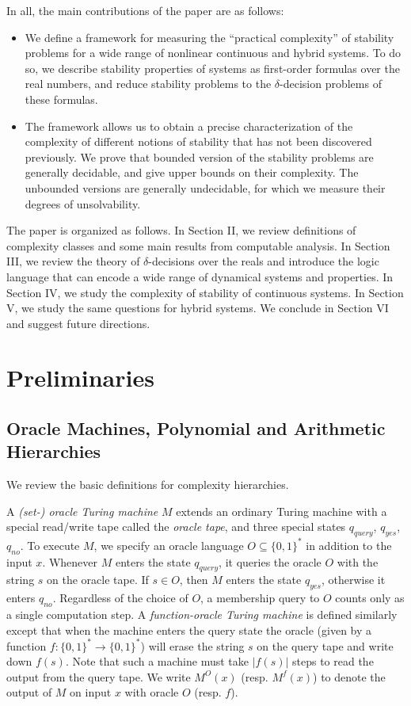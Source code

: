 \documentclass[12pt]{article}
\theoremstyle{plain}
\theoremstyle{definition}
\begin{document}
In all, the main contributions of the paper are as follows:
\begin{itemize}
\item We define a framework for measuring the ``practical complexity'' of stability problems for a wide range of nonlinear continuous and hybrid systems. To do so, we describe stability properties of systems as first-order formulas over the real numbers, and reduce stability problems to the $\delta$-decision problems of these formulas.
\item The framework allows us to obtain a precise characterization of the complexity of different notions of stability that has not been discovered previously. We prove that bounded version of the stability problems are generally decidable, and give upper bounds on their complexity. The unbounded versions are generally undecidable, for which we measure their degrees of unsolvability.
\end{itemize}
The paper is organized as follows. In Section II, we review definitions of complexity classes and some main results from computable analysis. In Section III, we review the theory of $\delta$-decisions over the reals and introduce the logic language that can encode a wide range of dynamical systems and properties. In Section IV, we study the complexity of stability of continuous systems. In Section V, we study the same questions for hybrid systems. We conclude in Section VI and suggest future directions.

\section{Preliminaries}
\subsection{Oracle Machines, Polynomial and Arithmetic Hierarchies}

We review the basic definitions for complexity hierarchies.

A {\em (set-) oracle Turing machine} $M$ extends an ordinary Turing machine with a special read/write tape called the {\em oracle tape}, and three special states $q_{\mathit{query}}$, $q_{\mathit{yes}}$, $q_{\mathit{no}}$. To execute $M$, we specify an oracle language $O\subseteq \{0,1\}^*$ in addition to the input $x$. Whenever $M$ enters the state $q_{\mathit{query}}$, it queries the oracle $O$ with the string $s$ on the oracle tape. If $s\in O$, then $M$ enters the state $q_{\mathit{yes}}$, otherwise it enters $q_{\mathit{no}}$. Regardless of the choice of $O$, a membership query to $O$ counts only as a single computation step. A {\em function-oracle Turing machine} is defined similarly except that when the machine enters the query state the oracle (given by a function $f:\{0,1\}^*\rightarrow\{0,1\}^*$) will erase the string $s$ on the query tape and write down $f(s)$. Note that such a machine must take $|f(s)|$ steps to read the output from the query tape. We write $M^O(x)$ (resp. $M^f(x)$) to denote the output of $M$ on input $x$ with oracle $O$ (resp. $f$).
\end{document}
